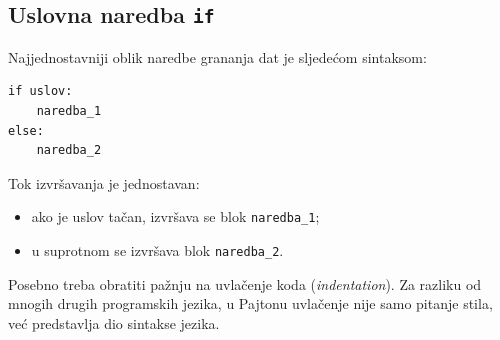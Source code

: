 \begin{table}[H]
	\caption{Osnovni operatori poređenja u Pajtonu.}
	\label{fig: operatori_poredjenja}
	
	\centering
	
\end{table}

\subsection{Uslovna naredba \texttt{if}}

Najjednostavniji oblik naredbe grananja dat je sljedećom sintaksom:

\begin{verbatim}
if uslov:
    naredba_1
else:
    naredba_2
\end{verbatim}

Tok izvršavanja je jednostavan:

\begin{itemize}
	\item ako je uslov tačan, izvršava se blok \texttt{naredba\_1};
	\item u suprotnom se izvršava blok \texttt{naredba\_2}.
\end{itemize}

Posebno treba obratiti pažnju na uvlačenje koda (\textit{indentation}). Za razliku od mnogih drugih programskih jezika, u Pajtonu uvlačenje nije samo pitanje stila, već predstavlja dio sintakse jezika.

